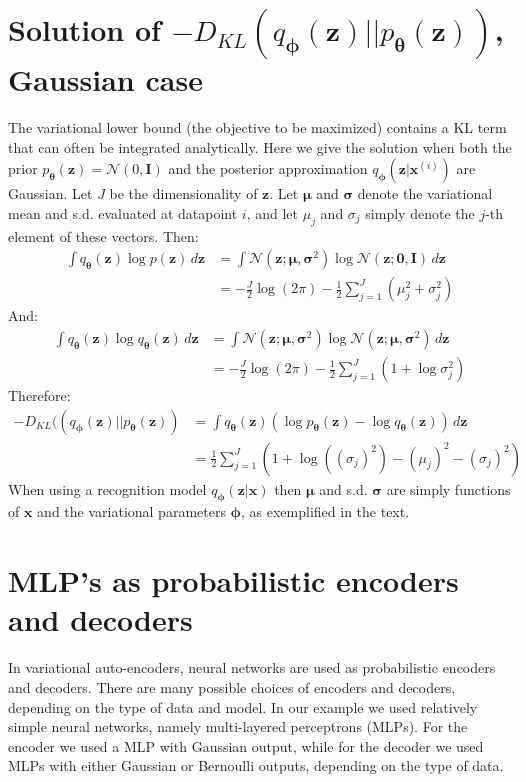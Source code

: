 \documentclass{article} %
\theoremstyle{definition}
\newcommand{\bb}[1]{\mathbf{#1}}
\newcommand{\bx}{\bb{x}}
\newcommand{\bxi}{\bx^{(i)}}
\newcommand{\bz}{\bb{z}}
\newcommand{\bT}{\boldsymbol{\theta}}
\newcommand{\bphi}{\boldsymbol{\phi}}
\newcommand{\bsigma}{\boldsymbol{\sigma}}
\newcommand{\bmu}{\boldsymbol{\mu}}
\newcommand{\bzero}{\bb{0}}
\newcommand{\bI}{\bb{I}}
\newcommand{\pT}{p_{\bT}}
\newcommand{\qT}{q_{\bT}}
\newcommand{\qPhi}{q_{\bphi}}
\theoremstyle{definition}
\begin{document}
\section{Solution of $- D_{KL}(\qPhi(\bz) || \pT(\bz))$, Gaussian case}
\label{ap:kl_solution}
The variational lower bound (the objective to be maximized) contains a KL term that can often be integrated analytically. Here we give the solution when both the prior $\pT(\bz) = \mathcal{N}(0,\bI)$ and the posterior approximation $\qPhi(\bz|\bxi)$ are Gaussian. Let $J$ be the dimensionality of $\bz$. Let $\bmu$ and $\bsigma$ denote the variational mean and s.d. evaluated at datapoint $i$, and let $\mu_j$ and $\sigma_j$ simply denote the $j$-th element of these vectors. Then:
\begin{align*}
\int \qT(\bz) \log p(\bz) \,d\bz
&= \int \mathcal{N}(\bz;\bmu,\bsigma^2) \log \mathcal{N}(\bz;\bzero,\bI) \,d\bz \\
&=  - \frac{J}{2} \log (2 \pi) - \frac{1}{2} \sum_{j=1}^J (\mu_j^2 + \sigma_j^2)
\end{align*}
And:
\begin{align*}
\int \qT(\bz) \log \qT(\bz) \,d\bz
&= \int \mathcal{N}(\bz;\bmu,\bsigma^2) \log \mathcal{N}(\bz;\bmu,\bsigma^2) \,d\bz \\
&= - \frac{J}{2} \log (2 \pi) - \frac{1}{2} \sum_{j=1}^J ( 1 + \log \sigma^2_j )
\end{align*}
Therefore:
\begin{align*}
- D_{KL}((\qPhi(\bz) || \pT(\bz)) &= \int \qT(\bz) \left(\log \pT(\bz) - \log \qT(\bz)\right) \,d\bz \\
&= \frac{1}{2} \sum_{j=1}^J \left(1 + \log ((\sigma_j)^2) - (\mu_j)^2 - (\sigma_j)^2 \right)
\end{align*}
When using a recognition model $\qPhi(\bz|\bx)$ then $\bmu$ and s.d. $\bsigma$ are simply functions of $\bx$ and the variational parameters $\bphi$, as exemplified in the text.

\section{MLP's as probabilistic encoders and decoders}
\label{ap:encoders_decoders}
In variational auto-encoders, neural networks are used as probabilistic encoders and decoders. There are many possible choices of encoders and decoders, depending on the type of data and model. In our example we used relatively simple neural networks, namely multi-layered perceptrons (MLPs). For the encoder we used a MLP with Gaussian output, while for the decoder we used MLPs with either Gaussian or Bernoulli outputs, depending on the type of data.
\end{document}
